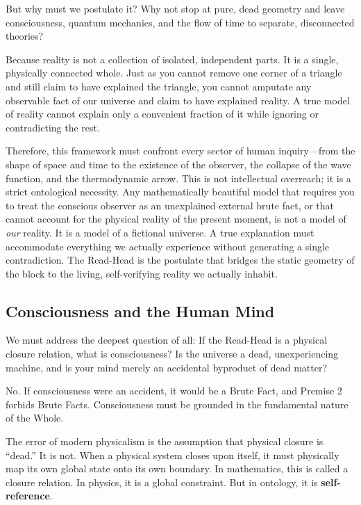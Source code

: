 \documentclass[11pt]{article}
\theoremstyle{canonstyle}
\begin{document}
But why must we postulate it? Why not stop at pure, dead geometry and leave consciousness, quantum mechanics, and the flow of time to separate, disconnected theories? 

Because reality is not a collection of isolated, independent parts. It is a single, physically connected whole. Just as you cannot remove one corner of a triangle and still claim to have explained the triangle, you cannot amputate any observable fact of our universe and claim to have explained reality. A true model of reality cannot explain only a convenient fraction of it while ignoring or contradicting the rest. 

Therefore, this framework must confront every sector of human inquiry---from the shape of space and time to the existence of the observer, the collapse of the wave function, and the thermodynamic arrow. This is not intellectual overreach; it is a strict ontological necessity. Any mathematically beautiful model that requires you to treat the conscious observer as an unexplained external brute fact, or that cannot account for the physical reality of the present moment, is not a model of \emph{our} reality. It is a model of a fictional universe. A true explanation must accommodate everything we actually experience without generating a single contradiction. The Read-Head is the postulate that bridges the static geometry of the block to the living, self-verifying reality we actually inhabit.

\subsection{Consciousness and the Human Mind}

We must address the deepest question of all: If the Read-Head is a physical closure relation, what is consciousness? Is the universe a dead, unexperiencing machine, and is your mind merely an accidental byproduct of dead matter?

No. If consciousness were an accident, it would be a Brute Fact, and Premise 2 forbids Brute Facts. Consciousness must be grounded in the fundamental nature of the Whole.

The error of modern physicalism is the assumption that physical closure is ``dead.'' It is not. When a physical system closes upon itself, it must physically map its own global state onto its own boundary. In mathematics, this is called a closure relation. In physics, it is a global constraint. But in ontology, it is \textbf{self-reference}.
\end{document}
